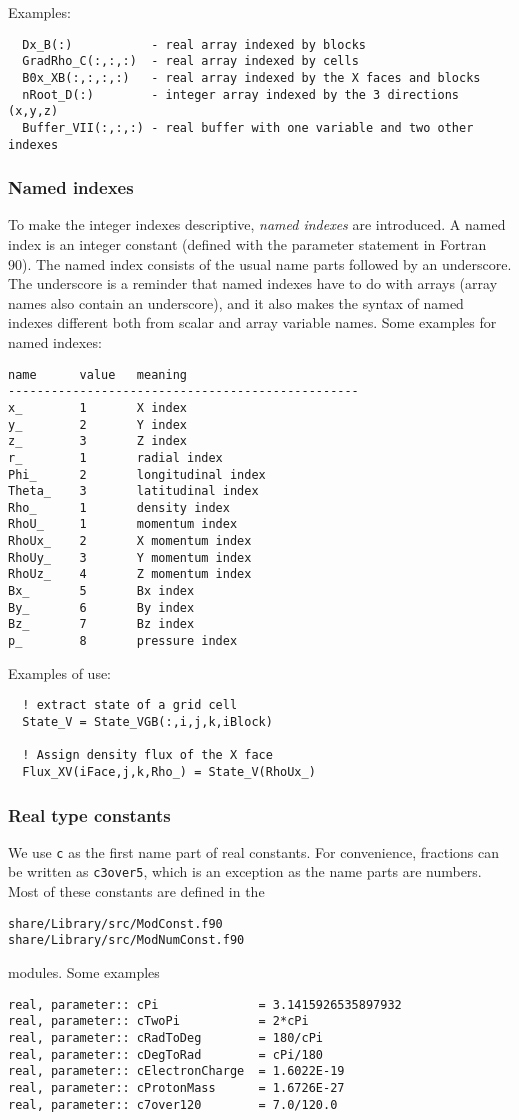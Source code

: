 \documentclass{article}
\begin{document}
Examples:
\begin{verbatim}
  Dx_B(:)           - real array indexed by blocks
  GradRho_C(:,:,:)  - real array indexed by cells
  B0x_XB(:,:,:,:)   - real array indexed by the X faces and blocks
  nRoot_D(:)        - integer array indexed by the 3 directions (x,y,z)
  Buffer_VII(:,:,:) - real buffer with one variable and two other indexes
\end{verbatim}

\subsubsection{Named indexes \label{sec:named}}

To make the integer indexes descriptive, 
{\it named indexes} are introduced. A named index is
an integer constant (defined with the parameter statement in Fortran 90).
The named index consists of the usual name parts followed by
an underscore. The underscore is a reminder that named indexes
have to do with arrays (array names also contain an underscore), 
and it also makes the syntax of named
indexes different both from scalar and array variable names. 
Some examples for named indexes:
\begin{verbatim}
name      value   meaning
-------------------------------------------------
x_        1       X index
y_        2       Y index
z_        3       Z index
r_        1       radial index
Phi_      2       longitudinal index
Theta_    3       latitudinal index
Rho_      1       density index
RhoU_     1       momentum index
RhoUx_    2       X momentum index
RhoUy_    3       Y momentum index
RhoUz_    4       Z momentum index
Bx_       5       Bx index
By_       6       By index
Bz_       7       Bz index
p_        8       pressure index
\end{verbatim}
Examples of use:
\begin{verbatim}
  ! extract state of a grid cell
  State_V = State_VGB(:,i,j,k,iBlock)

  ! Assign density flux of the X face
  Flux_XV(iFace,j,k,Rho_) = State_V(RhoUx_)
\end{verbatim}

\subsubsection{Real type constants}

We use {\tt c} as the first name part of real constants.
For convenience, fractions can be written as {\tt c3over5},
which is an exception as the name parts are numbers. 
Most of these constants are defined in the
\begin{verbatim}
share/Library/src/ModConst.f90
share/Library/src/ModNumConst.f90
\end{verbatim}
modules. Some examples
\begin{verbatim}
real, parameter:: cPi              = 3.1415926535897932
real, parameter:: cTwoPi           = 2*cPi
real, parameter:: cRadToDeg        = 180/cPi
real, parameter:: cDegToRad        = cPi/180
real, parameter:: cElectronCharge  = 1.6022E-19
real, parameter:: cProtonMass      = 1.6726E-27
real, parameter:: c7over120        = 7.0/120.0
\end{verbatim}
\end{document}
